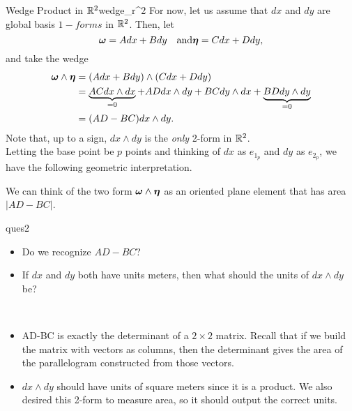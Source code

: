 \begin{ex}{Wedge Product in $\mathbb{R}^2$}{wedge_r^2}
For now, let us assume that $dx$ and $dy$ are global basis $1-forms$ in $\mathbb{R}^2$. Then, let
\[
\boldsymbol{\omega} = Adx+Bdy \quad \textrm{and} \boldsymbol{\eta} = Cdx+Ddy,
\]
and take the wedge
\begin{align*}
    \boldsymbol{\omega} \wedge \boldsymbol{\eta} &= (Adx+Bdy)\wedge (Cdx+Ddy)\\
    &=\underbrace{ACdx\wedge dx}_{=0} +ADdx\wedge dy +BC dy\wedge dx + \underbrace{BD dy\wedge dy}_{=0}\\
    &= (AD-BC)dx\wedge dy.
\end{align*}
Note that, up to a sign, $dx\wedge dy$ is the \emph{only} 2-form in $\mathbb{R}^2$.\\

Letting the base point be $p$ points and thinking of $dx$ as $e_{1_p}$ and $dy$ as $e_{2_p}$, we have the following geometric interpretation.
\begin{center}
\end{center}
We can think of the two form $\boldsymbol{\omega} \wedge \boldsymbol{\eta}$ as an oriented plane element that has area $|AD-BC|$.
\end{ex}

\begin{ques}{}{ques2}
\begin{itemize}
    \item Do we recognize $AD-BC$?
    \item If $dx$ and $dy$ both have units meters, then what should the units of $dx\wedge dy$ be?
\end{itemize}
\tcblower
\begin{answer*}~
\begin{itemize}
    \item AD-BC is exactly the determinant of a $2\times 2$ matrix. Recall that if we build the matrix with vectors as columns, then the determinant gives the area of the parallelogram constructed from those vectors.
    \item $dx\wedge dy$ should have units of square meters since it is a product.  We also desired this 2-form to measure area, so it should output the correct units.
\end{itemize}
\end{answer*}
\end{ques}



